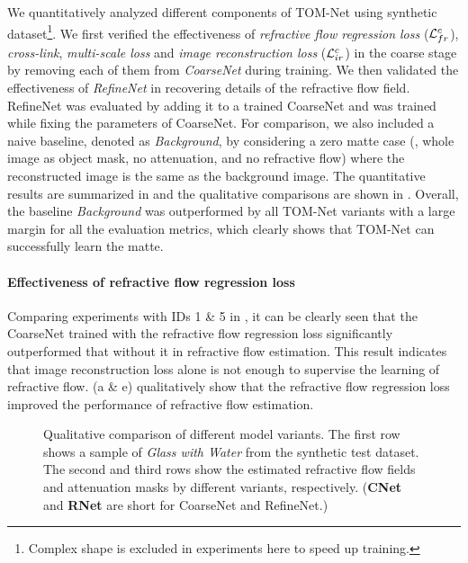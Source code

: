 We quantitatively analyzed different components of TOM-Net using synthetic dataset\footnote{Complex shape is excluded in experiments here to speed up training.}. We first verified the effectiveness of \emph{refractive flow regression loss} ($\mathcal{L}^{c}_{fr}$), \emph{cross-link}, \emph{multi-scale loss} and \emph{image reconstruction loss} ($\mathcal{L}^{c}_{ir}$) in the coarse stage by removing each of them from \emph{CoarseNet} during training. We then validated the effectiveness of \emph{RefineNet} in recovering details of the refractive flow field.  RefineNet was evaluated by adding it to a trained CoarseNet and was trained while fixing the parameters of CoarseNet. 
For comparison, we also included a naive baseline, denoted as \emph{Background}, by considering a zero matte case (\ie, whole image as object mask, no attenuation, and no refractive flow) where the reconstructed image is the same as the background image. The quantitative results are summarized in  and the qualitative comparisons are shown in .
Overall, the baseline \emph{Background} was outperformed by all TOM-Net variants with a large margin for all the evaluation metrics, which clearly shows that TOM-Net can successfully learn the matte. 

\paragraph{Effectiveness of refractive flow regression loss} Comparing experiments with IDs 1 \& 5 in , it can be clearly seen that the CoarseNet trained with the refractive flow regression loss significantly outperformed that without it in refractive flow estimation. This result indicates that image reconstruction loss alone is not enough to supervise the learning of refractive flow.  (a \& e) qualitatively show that the refractive flow regression loss improved the performance of refractive flow estimation.

\begin{figure}[tbp] \centering
    
    \caption[Qualitative comparison of different model variants]{Qualitative comparison of different model variants. The first row shows a sample of \emph{Glass with Water} from the synthetic test dataset. The second and third rows show the estimated refractive flow fields and attenuation masks by different variants, respectively. (\textbf{CNet} and \textbf{RNet} are short for CoarseNet and RefineNet.)} \label{fig:syn_ablation_study}
\end{figure}

